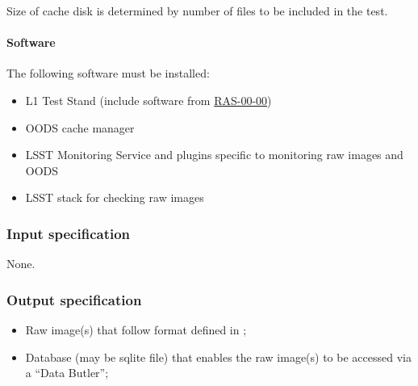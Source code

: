 \documentclass[DM,lsstdraft,STS,toc]{lsstdoc}
\begin{document}
Size of cache disk is determined by number of files to be included in the test.






\paragraph{Software}


The following software must be installed:
\begin{itemize}
\item{L1 Test Stand (include software from \hyperref[ras-00-00]{RAS-00-00})}
\item{OODS cache manager}
\item{LSST Monitoring Service and plugins specific to monitoring raw images and OODS}
\item{LSST stack for checking raw images}
\end{itemize}




\subsubsection{Input specification}


None.


\subsubsection{Output specification}
\begin{itemize}
\item{Raw image(s) that follow format defined in ;}
\item{Database (may be sqlite file) that enables the raw image(s) to be accessed via a ``Data Butler'';}
\end{itemize}
\end{document}

